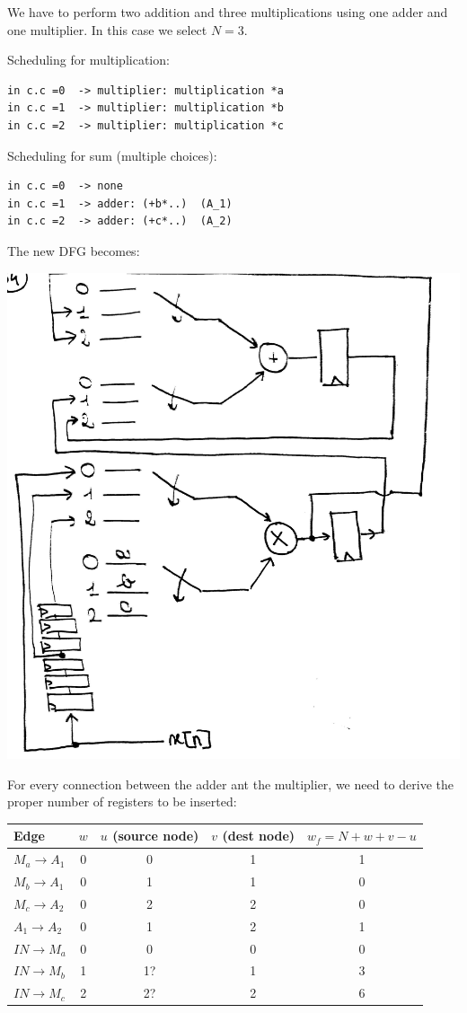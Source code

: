 We have to perform two addition and three multiplications using one adder and one multiplier. In this case we select $N=3$.

Scheduling for multiplication:
\begin{verbatim}
in c.c =0  -> multiplier: multiplication *a
in c.c =1  -> multiplier: multiplication *b
in c.c =2  -> multiplier: multiplication *c
\end{verbatim}

Scheduling for sum (multiple choices):
\begin{verbatim}
in c.c =0  -> none
in c.c =1  -> adder: (+b*..)  (A_1)
in c.c =2  -> adder: (+c*..)  (A_2)
\end{verbatim}

The new DFG becomes:

\begin{center}
  \includegraphics[width=0.7\linewidth]{img/img1/34}
\end{center}

For every connection between the adder ant the multiplier, we need to derive the proper number of registers to be inserted:
\begin{center}
  \begin{tabular}{|l|c|c|c|c|}
  \hline
  Edge &                $w$&    $u$ (source node)&    $v$ (dest node)&    $w_f=N+w+v-u$\\
  \hline
  $M_a \longrightarrow A_1$&      0&      0&            1&            1\\
  $M_b \longrightarrow A_1$&      0&      1&            1&            0 \\
  $M_c \longrightarrow A_2$&      0&      2&            2&            0 \\
  $A_1 \longrightarrow A_2$&      0&      1&            2&            1\\
  $IN \longrightarrow M_a$&     0&      0&            0&            0 \\
  $IN \longrightarrow M_b$&     1&      1?&           1&            3\\
  $IN \longrightarrow M_c$&     2&      2?&           2&            6\\
  \hline
  \end{tabular}
\end{center}

